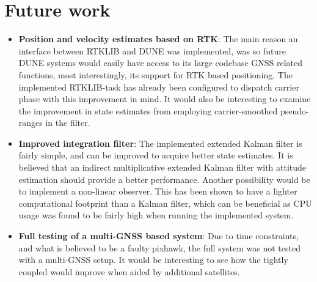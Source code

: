 \section{Future work}
    \begin{itemize}
        \item \textbf{Position and velocity estimates based on RTK}: The main reason an interface between RTKLIB and DUNE was implemented, was so future DUNE systems would easily have access to its large codebase GNSS related functions, most interestingly, its support for RTK based positioning. The implemented RTKLIB-task has already been configured to dispatch carrier phase with this improvement in mind. It would also be interesting to examine the improvement in state estimates from employing carrier-smoothed pseudo-ranges in the filter. 
        \item \textbf{Improved integration filter}: The implemented extended Kalman filter is fairly simple, and can be improved to acquire better state estimates. It is believed that an indirect multiplicative extended Kalman filter with attitude estimation should provide a better performance. Another possibility would be to implement a non-linear observer. This has been shown to have a lighter computational footprint than a Kalman filter, which can be beneficial as CPU usage was found to be fairly high when running the implemented system. 
        \item \textbf{Full testing of a multi-GNSS based system}: Due to time constraints, and what is believed to be a faulty pixhawk, the full system was not tested with a multi-GNSS setup. It would be interesting to see how the tightly coupled would improve when aided by additional satellites.
    \end{itemize}







